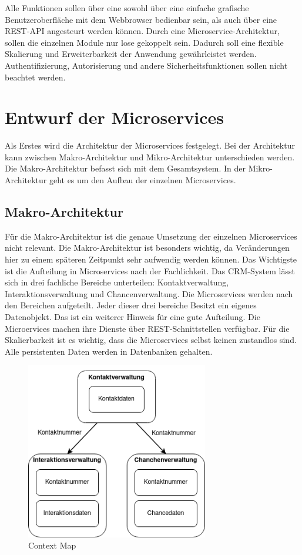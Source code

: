 Alle Funktionen sollen über eine sowohl über eine einfache grafische Benutzeroberfläche mit dem Webbrowser bedienbar sein, als auch über eine REST-API angesteurt werden können. Durch eine Microservice-Architektur, sollen die einzelnen Module nur lose gekoppelt sein. Dadurch soll eine flexible Skalierung und Erweiterbarkeit der Anwendung gewährleistet werden. Authentifizierung, Autorisierung und andere Sicherheitsfunktionen sollen nicht beachtet werden.

\clearpage
\section{Entwurf der Microservices}



Als Erstes wird die Architektur der Microservices festgelegt. Bei der Architektur kann zwischen Makro-Architektur und Mikro-Architektur unterschieden werden. Die Makro-Architektur befasst sich mit dem Gesamtsystem. In der Mikro-Architektur geht es um den Aufbau der einzelnen Microservices.

\subsection{Makro-Architektur}

Für die Makro-Architektur ist die genaue Umsetzung der einzelnen Microservices nicht relevant. Die Makro-Architektur ist besonders wichtig, da Veränderungen hier zu einem späteren Zeitpunkt sehr aufwendig werden können. Das Wichtigste ist die Aufteilung in Microservices nach der Fachlichkeit. Das CRM-System lässt sich in drei fachliche Bereiche unterteilen: Kontaktverwaltung, Interaktionsverwaltung und Chancenverwaltung. Die Microservices werden nach den Bereichen aufgeteilt. Jeder dieser drei bereiche Besitzt ein eigenes Datenobjekt. Das  ist ein weiterer Hinweis für eine gute Aufteilung. Die Microervices machen ihre Dienste über REST-Schnittstellen verfügbar. Für die Skalierbarkeit ist es wichtig, dass die Microservices selbst keinen zustandlos sind. Alle persistenten Daten werden in Datenbanken gehalten.

\begin{figure}[H] 
    \centering
    \includegraphics[width=0.71\textwidth]{figures/ContextMap.png}
    \caption{Context Map}
    \label{fig:CRMENTWURF}
\end{figure}

